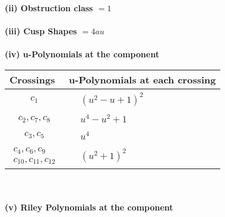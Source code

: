 \documentclass[1p]{elsarticle_modified}
\theoremstyle{definition}
\begin{document}
\flushleft \textbf{(ii) Obstruction class $= 1$}\\~\\
\flushleft \textbf{(iii) Cusp Shapes $= 4 a u$}\\~\\
\newpage\renewcommand{\arraystretch}{1}
\flushleft \textbf{(iv) u-Polynomials at the component}\newline \\
\begin{tabular}{m{50pt}|m{274pt}}
Crossings & \hspace{64pt}u-Polynomials at each crossing \\
\hline $$\begin{aligned}c_{1}\end{aligned}$$&$\begin{aligned}
&(u^2- u+1)^2
\end{aligned}$\\
\hline $$\begin{aligned}c_{2},c_{7},c_{8}\end{aligned}$$&$\begin{aligned}
&u^4- u^2+1
\end{aligned}$\\
\hline $$\begin{aligned}c_{3},c_{5}\end{aligned}$$&$\begin{aligned}
&u^4
\end{aligned}$\\
\hline $$\begin{aligned}c_{4},c_{6},c_{9}\\c_{10},c_{11},c_{12}\end{aligned}$$&$\begin{aligned}
&(u^2+1)^2
\end{aligned}$\\
\hline
\end{tabular}\\~\\
\newpage\renewcommand{\arraystretch}{1}
\flushleft \textbf{(v) Riley Polynomials at the component}\newline \\
\end{document}
